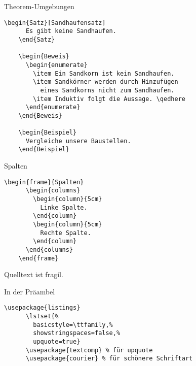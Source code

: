
\begin{Frame}[fragile]{Theorem-Umgebungen}
  \begin{lstlisting}[gobble=4]
    \begin{Satz}[Sandhaufensatz]
      Es gibt keine Sandhaufen.
    \end{Satz}

    \begin{Beweis}
      \begin{enumerate}
        \item Ein Sandkorn ist kein Sandhaufen.
        \item Sandkörner werden durch Hinzufügen
          eines Sandkorns nicht zum Sandhaufen.
        \item Induktiv folgt die Aussage. \qedhere
      \end{enumerate}
    \end{Beweis}

    \begin{Beispiel}
      Vergleiche unsere Baustellen.
    \end{Beispiel}
  \end{lstlisting}
\end{Frame}


\begin{Frame}[fragile]{Spalten}
  \begin{lstlisting}[gobble=4]
    \begin{frame}{Spalten}
      \begin{columns}
        \begin{column}{5cm}
          Linke Spalte.
        \end{column}
        \begin{column}{5cm}
          Rechte Spalte.
        \end{column}
      \end{columns}
    \end{frame}
  \end{lstlisting}
\end{Frame}


\begin{Frame}[fragile]{Quelltext ist fragil.}
  \begin{Block}{In der Präambel}
    \begin{lstlisting}[style=block,gobble=6]
      \usepackage{listings}
      \lstset{%
        basicstyle=\ttfamily,%
        showstringspaces=false,%
        upquote=true}
      \usepackage{textcomp} % für upquote
      \usepackage{courier} % für schönere Schriftart
    \end{lstlisting}
  \end{Block}

  \xxx

  
\end{Frame}

